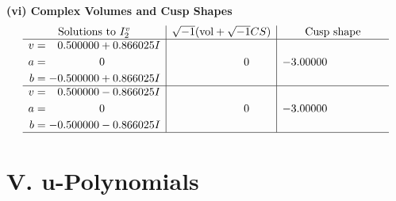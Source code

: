 \documentclass[1p]{elsarticle_modified}
\theoremstyle{definition}
\newcommand{\I}{\sqrt{-1}}
\begin{document}
\newpage\flushleft \textbf{(vi) Complex Volumes and Cusp Shapes}
$$\begin{array}{c|c|c}  
\text{Solutions to }I^v_{2}& \I (\text{vol} + \sqrt{-1}CS) & \text{Cusp shape}\\
 \hline 
\begin{aligned}
v &= \phantom{-}0.500000 + 0.866025 I \\
a &= \phantom{-0.000000 } 0 \\
b &= -0.500000 + 0.866025 I\end{aligned}
 & \phantom{-0.000000 } 0 & -3.00000\phantom{ +0.000000I} \\ \hline\begin{aligned}
v &= \phantom{-}0.500000 - 0.866025 I \\
a &= \phantom{-0.000000 } 0 \\
b &= -0.500000 - 0.866025 I\end{aligned}
 & \phantom{-0.000000 } 0 & -3.00000\phantom{ +0.000000I}\\
 \hline 
 \end{array}$$\newpage
\newpage\renewcommand{\arraystretch}{1}
\centering \section*{ V. u-Polynomials}
\end{document}
